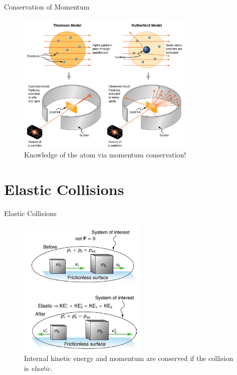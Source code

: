 \documentclass{beamer}
\begin{document}
\begin{frame}{Conservation of Momentum}
\begin{figure}
\centering
\includegraphics[width=0.75\textwidth]{figures/alpha.png}
\caption{\label{fig:alpha} Knowledge of the atom via momentum conservation!}
\end{figure}
\end{frame}

\section{Elastic Collisions}

\begin{frame}{Elastic Collisions}
\begin{figure}
\centering
\includegraphics[width=0.55\textwidth]{figures/elastic.png}
\caption{\label{fig:elastic} \small Internal kinetic energy and momentum are conserved if the collision is \textit{elastic}.}
\end{figure}
\end{frame}
\end{document}
